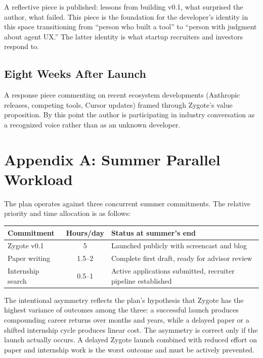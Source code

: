 \documentclass[11pt,letterpaper]{article}
\begin{document}
A reflective piece is published: lessons from building v0.1, what surprised the author, what failed. This piece is the foundation for the developer's identity in this space transitioning from ``person who built a tool'' to ``person with judgment about agent UX.'' The latter identity is what startup recruiters and investors respond to.

\subsection*{Eight Weeks After Launch}

A response piece commenting on recent ecosystem developments (Anthropic releases, competing tools, Cursor updates) framed through Zygote's value proposition. By this point the author is participating in industry conversation as a recognized voice rather than as an unknown developer.

\section*{Appendix A: Summer Parallel Workload}

The plan operates against three concurrent summer commitments. The relative priority and time allocation is as follows:

\begin{tabularx}{\textwidth}{@{}lcX@{}}
\toprule
\textbf{Commitment} & \textbf{Hours/day} & \textbf{Status at summer's end} \\
\midrule
Zygote v0.1 & 5 & Launched publicly with screencast and blog \\
Paper writing & 1.5--2 & Complete first draft, ready for advisor review \\
Internship search & 0.5--1 & Active applications submitted, recruiter pipeline established \\
\bottomrule
\end{tabularx}

\medskip
\noindent The intentional asymmetry reflects the plan's hypothesis that Zygote has the highest variance of outcomes among the three: a successful launch produces compounding career returns over months and years, while a delayed paper or a shifted internship cycle produces linear cost. The asymmetry is correct only if the launch actually occurs. A delayed Zygote launch combined with reduced effort on paper and internship work is the worst outcome and must be actively prevented.
\end{document}
